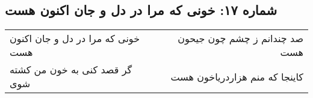 \begin{center}
\section*{شماره ۱۷: خونی که مرا در دل و جان اکنون هست}
\label{sec:017}
\begin{longtable}{l p{0.5cm} r}
خونی که مرا در دل و جان اکنون هست
&&
صد چندانم ز چشم چون جیحون هست
\\
گر قصد کنی به خون من کشته شوی
&&
کاینجا که منم هزاردریاخون هست
\\
\end{longtable}
\end{center}
